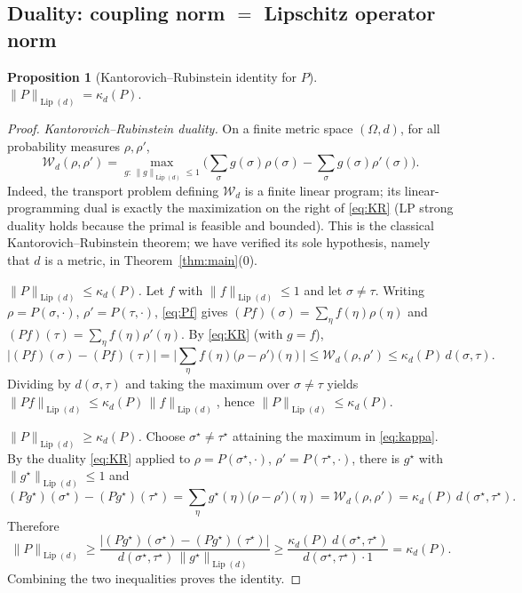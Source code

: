 \documentclass{amsart}
\newtheorem{proposition}{Proposition}
\DeclareMathOperator{\Lip}{Lip}
\newcommand{\Om}{\Omega}
\newcommand{\Wd}{\mathcal{W}_d}
\begin{document}
\subsection{Duality: coupling norm $=$ Lipschitz operator norm}
\begin{proposition}[Kantorovich--Rubinstein identity for $P$]\label{prop:duality}
$\displaystyle \|P\|_{\Lip(d)}=\kappa_d(P).$
\end{proposition}
\begin{proof}
\emph{Kantorovich--Rubinstein duality.} On a finite metric space $(\Om,d)$, for
all probability measures $\rho,\rho'$,
\begin{equation}\label{eq:KR}
\Wd(\rho,\rho')=\max_{g:\,\|g\|_{\Lip(d)}\le1}\Big(\sum_\sigma g(\sigma)\rho(\sigma)
-\sum_\sigma g(\sigma)\rho'(\sigma)\Big).
\end{equation}
Indeed, the transport problem defining $\Wd$ is a finite linear program;
its linear-programming dual is exactly the maximization on the right of
\eqref{eq:KR} (LP strong duality holds because the primal is feasible and
bounded). This is the classical Kantorovich--Rubinstein theorem; we have verified
its sole hypothesis, namely that $d$ is a metric, in
Theorem~\ref{thm:main}(0).

\smallskip
\emph{$\|P\|_{\Lip(d)}\le\kappa_d(P)$.} Let $f$ with $\|f\|_{\Lip(d)}\le1$ and let
$\sigma\neq\tau$. Writing $\rho=P(\sigma,\cdot)$, $\rho'=P(\tau,\cdot)$,
\eqref{eq:Pf} gives $(Pf)(\sigma)=\sum_\eta f(\eta)\rho(\eta)$ and
$(Pf)(\tau)=\sum_\eta f(\eta)\rho'(\eta)$. By \eqref{eq:KR} (with $g=f$),
\[
|(Pf)(\sigma)-(Pf)(\tau)|=\Big|\sum_\eta f(\eta)\big(\rho-\rho'\big)(\eta)\Big|
\le \Wd(\rho,\rho')\le\kappa_d(P)\,d(\sigma,\tau).
\]
Dividing by $d(\sigma,\tau)$ and taking the maximum over $\sigma\neq\tau$ yields
$\|Pf\|_{\Lip(d)}\le\kappa_d(P)\,\|f\|_{\Lip(d)}$, hence
$\|P\|_{\Lip(d)}\le\kappa_d(P)$.

\smallskip
\emph{$\|P\|_{\Lip(d)}\ge\kappa_d(P)$.} Choose $\sigma^\star\neq\tau^\star$
attaining the maximum in \eqref{eq:kappa}. By the duality \eqref{eq:KR} applied to
$\rho=P(\sigma^\star,\cdot)$, $\rho'=P(\tau^\star,\cdot)$, there is $g^\star$ with
$\|g^\star\|_{\Lip(d)}\le1$ and
\[
(Pg^\star)(\sigma^\star)-(Pg^\star)(\tau^\star)
=\sum_\eta g^\star(\eta)\big(\rho-\rho'\big)(\eta)
=\Wd(\rho,\rho')=\kappa_d(P)\,d(\sigma^\star,\tau^\star).
\]
Therefore
\[
\|P\|_{\Lip(d)}\ge\frac{|(Pg^\star)(\sigma^\star)-(Pg^\star)(\tau^\star)|}
{d(\sigma^\star,\tau^\star)\,\|g^\star\|_{\Lip(d)}}
\ge\frac{\kappa_d(P)\,d(\sigma^\star,\tau^\star)}{d(\sigma^\star,\tau^\star)\cdot1}
=\kappa_d(P).
\]
Combining the two inequalities proves the identity.
\end{proof}
\end{document}
